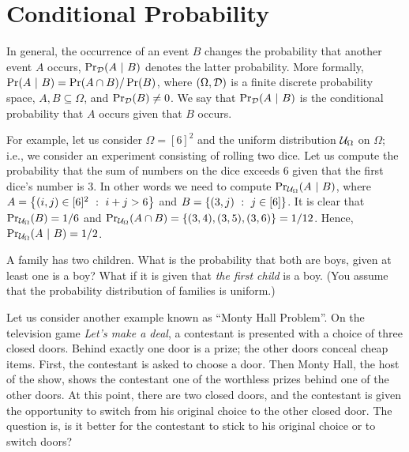 \chapter{Conditional Probability}
In general, the occurrence of an event $B$ changes the probability that another
event $A$ occurs, $\Pr_{\mathcal{D}}(A ~\rvert~ B)$ denotes the latter
probability. More formally, $\Pr(A ~\rvert~ B) = \Pr(A \cap B) / \Pr(B)$, where
$(\Omega, \mathcal{D})$ is a finite discrete probability space, 
$A, B \subseteq \Omega$, and $\Pr_{\mathcal{D}}(B) \neq 0$.
We say that $\Pr_{\mathcal{D}}(A ~\rvert~ B)$ is the conditional probability
that $A$ occurs given that $B$ occurs.

For example, let us consider $\Omega = [6]^2$ and the uniform distribution
$\mathcal{U}_{\Omega}$ on $\Omega$; i.e., we consider an experiment consisting of
rolling two dice. Let us compute the probability that the sum of numbers on the
dice exceeds $6$ given that the first dice's number is $3$. In other words we
need to compute $\Pr_{\mathcal{U}_{\Omega}}(A ~\rvert~ B)$, where 
$A = \set[i + j > 6]{(i, j) \in [6]^2}$ and 
$B = \set[{j \in [6]}]{(3, j)}$. It is clear that $\Pr_{\mathcal{U}_{\Omega}}(B) = 
1 / 6$ and
$\Pr_{\Uniform{\Omega}}(A \cap B) = \set{(3, 4), (3, 5), (3, 6)} = 1 / 12$. 
Hence, $\Pr_{\mathcal{U}_{\Omega}}(A ~\rvert~ B) = 1 / 2$.

\begin{exercise}
  A family has two children. What is the probability that both are boys, given
  at least one is a boy? What if it is given that \emph{the first child} is a
  boy. (You assume that the probability distribution of families is uniform.)
\end{exercise}

Let us consider another example known as ``Monty Hall Problem''. On the
television game \emph{Let’s make a deal}, a contestant is presented with a
choice of three closed doors. Behind exactly one door is a prize; the other
doors conceal cheap items. First, the contestant is asked to choose a door. Then
Monty Hall, the host of the show,  shows the contestant one of the worthless
prizes behind one of the other doors. At this point, there are two closed
doors, and the contestant is given the opportunity to switch from his original
choice to the other closed door. The question is, is it better for the
contestant to stick to his original choice or to switch doors?


